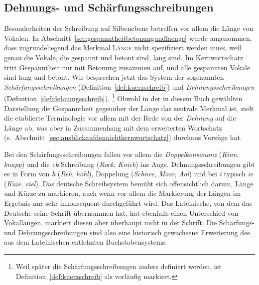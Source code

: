 \subsection{Dehnungs- und Schärfungsschreibungen}
\label{sec:dehnungsundschaerfungsschreibungen}

Besonderheiten der Schreibung auf Silbenebene betreffen vor allem die Länge von Vokalen.
In Abschnitt~\ref{sec:gespanntheitbetonungundlaenge} wurde angenommen, dass zugrundeliegend das Merkmal \textsc{Länge} nicht spezifiziert werden muss, weil genau die Vokale, die gespannt und betont sind, lang sind.
Im Kernwortschatz tritt Gespanntheit nur mit Betonung zusammen auf, und alle gespannten Vokale sind lang und betont.
Wir besprechen jetzt das System der sogenannten \textit{Schärfungsschreibungen} (Definition~\ref{def:kuerzschreib}) und \textit{Dehnungsschreibungen} (Definition~\ref{def:dehnungsschreib}).%
\footnote{Weil später die Schärfungsschreibungen anders definiert werden, ist Definition~\ref{def:kuerzschreib} als vorläufig markiert.}
Obwohl in der in diesem Buch gewählten Darstellung die Gespanntheit gegenüber der Länge das zentrale Merkmal ist, zielt die etablierte Terminologie vor allem mit der Rede von der \textit{Dehnung} auf die Länge ab, was aber in Zusammenhang mit dem erweiterten Wortschatz (s.\ Abschnitt~\ref{sec:ausblickaufdennichtkernwortschatz}) durchaus Vorzüge hat.




Bei den Schärfungsschreibungen fallen vor allem die \textit{Doppelkonsonanz} (\textit{Kinn}, \textit{knapp}) und die \textit{ck}-Schreibung (\textit{Rock}, \textit{Knick}) ins Auge.
Dehnungsschreibungen gibt es in Form von \textit{h} (\textit{Reh}, \textit{hohl}), Doppelung (\textit{Schnee}, \textit{Moor}, \textit{Aal}) und bei \textit{i} typisch \textit{ie} (\textit{Knie}, \textit{viel}).
Das deutsche Schreibsystem bemüht sich offensichtlich darum, Länge und Kürze zu markieren, auch wenn vor allem die Markierung der Längen im Ergebnis nur sehr inkonsequent durchgeführt wird.
Das Lateinische, von dem das Deutsche seine Schrift übernommen hat, hat ebenfalls einen Unterschied von Vokallängen, markiert diesen aber überhaupt nicht in der Schrift.
Die Schärfungs- und Dehnungsschreibungen sind also eine historisch gewachsene Erweiterung des aus dem Lateinischen entlehnten Buchstabensystems.


